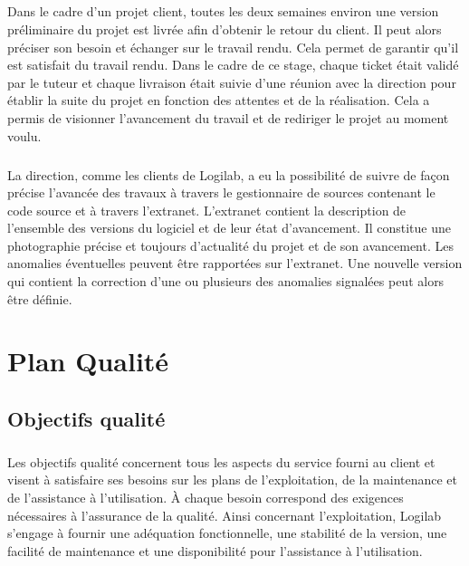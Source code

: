 \documentclass {report}
\begin{document}
\paragraph{}
Dans le cadre d'un projet client, toutes les deux semaines environ une version préliminaire du projet est livrée afin d'obtenir le retour du client. Il peut alors préciser son besoin et échanger sur le travail rendu. Cela permet de garantir qu'il est satisfait du travail rendu. Dans le cadre de ce stage, chaque ticket était validé par le tuteur et chaque livraison était suivie d'une réunion avec la direction pour établir la suite du projet en fonction des attentes et de la réalisation. Cela a permis de visionner l'avancement du travail et de rediriger le projet au moment voulu.
\paragraph{}
La direction, comme les clients de Logilab, a eu la possibilité de suivre de façon précise l’avancée des travaux à travers le gestionnaire de sources contenant le code source et à travers l’extranet. L’extranet contient la description de l’ensemble des versions du logiciel et de leur état d’avancement. Il constitue une photographie précise et toujours d’actualité du projet et de son avancement. Les anomalies éventuelles peuvent être rapportées sur l’extranet. Une nouvelle version qui contient la correction d’une ou plusieurs des anomalies signalées peut alors être définie.



\chapter{Plan Qualité}
\section{Objectifs qualité}
\paragraph{}
Les objectifs qualité concernent tous les aspects du service fourni au client et visent à satisfaire ses besoins sur les plans de l’exploitation, de la maintenance et de l’assistance à l’utilisation. À chaque besoin correspond des exigences nécessaires à l’assurance de la qualité. Ainsi concernant l'exploitation, Logilab s'engage à fournir une adéquation fonctionnelle, une stabilité de la version, une facilité de maintenance et une disponibilité pour l'assistance à l'utilisation.
\end{document}
